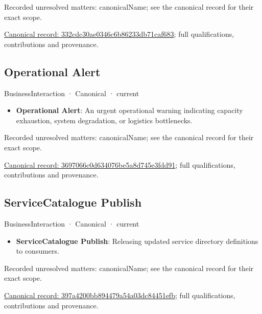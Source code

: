 {\small Recorded unresolved matters: canonicalName; see the canonical record for their exact scope.}\par
{\footnotesize \href{../../../../continuum/business/business-interaction/332cdc30ae0346c6b86233db71caf683.md}{Canonical record: 332cdc30ae0346c6b86233db71caf683}; full qualifications, contributions and provenance.}\par
\subsection{Operational Alert}

\label{element:3697066c0d634076be5a8d745e3fdd91}
{\small BusinessInteraction · Canonical · current}\par

\begin{itemize}


\item \textbf{Operational Alert}: An urgent operational warning indicating capacity exhaustion, system degradation, or logistics bottlenecks.

\end{itemize}

{\small Recorded unresolved matters: canonicalName; see the canonical record for their exact scope.}\par
{\footnotesize \href{../../../../continuum/business/business-interaction/3697066c0d634076be5a8d745e3fdd91.md}{Canonical record: 3697066c0d634076be5a8d745e3fdd91}; full qualifications, contributions and provenance.}\par
\subsection{ServiceCatalogue Publish}

\label{element:397a4200bb894479a54a03dc84451efb}
{\small BusinessInteraction · Canonical · current}\par

\begin{itemize}


\item \textbf{ServiceCatalogue Publish}: Releasing updated service directory definitions to consumers.

\end{itemize}

{\small Recorded unresolved matters: canonicalName; see the canonical record for their exact scope.}\par
{\footnotesize \href{../../../../continuum/business/business-interaction/397a4200bb894479a54a03dc84451efb.md}{Canonical record: 397a4200bb894479a54a03dc84451efb}; full qualifications, contributions and provenance.}\par

